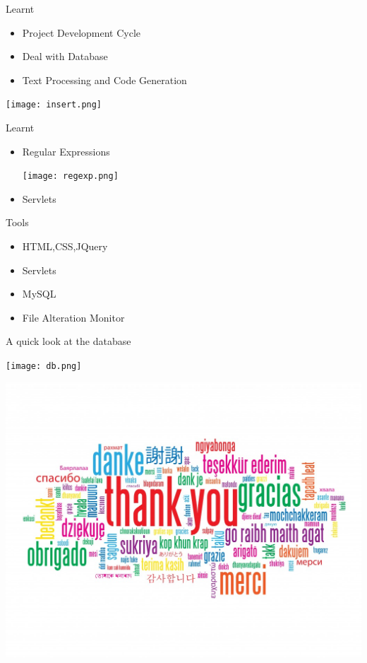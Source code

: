 \documentclass[14pt]{beamer}
\begin{document}
\begin{frame}{Learnt}
	\begin{itemize}
		\item Project Development Cycle
		\item Deal with Database
		\item Text Processing and Code Generation
	\end{itemize}
	\begin{center}
		\texttt{[image: insert.png]}
	\end{center}
\end{frame}

\begin{frame}{Learnt}
	\begin{itemize}
		\item Regular Expressions
		\begin{center}
			\texttt{[image: regexp.png]}
		\end{center}
	\item Servlets
	\end{itemize}
\end{frame}

\begin{frame}{Tools}
	\begin{itemize}
		\item HTML,CSS,JQuery
		\item Servlets
		\item MySQL
		\item File Alteration Monitor
	\end{itemize}
\end{frame}


\begin{frame}{A quick look at the database}
	\begin{center}
		\texttt{[image: db.png]}
	\end{center}
\end{frame}

\begin{frame}
	\begin{center}
		\includegraphics[scale=0.2]{ty.jpg}
	\end{center}
\end{frame}
\end{document}
